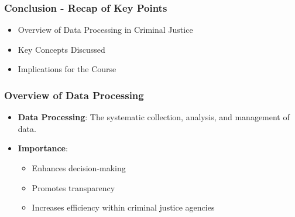\documentclass[aspectratio=169]{beamer}
\begin{document}
\begin{frame}[fragile]
    \frametitle{Conclusion - Recap of Key Points}
    \begin{itemize}
        \item Overview of Data Processing in Criminal Justice
        \item Key Concepts Discussed
        \item Implications for the Course
    \end{itemize}
\end{frame}

\begin{frame}[fragile]
    \frametitle{Overview of Data Processing}
    \begin{itemize}
        \item \textbf{Data Processing}: The systematic collection, analysis, and management of data.
        \item \textbf{Importance}:
        \begin{itemize}
            \item Enhances decision-making
            \item Promotes transparency
            \item Increases efficiency within criminal justice agencies
        \end{itemize}
    \end{itemize}
\end{frame}
\end{document}
